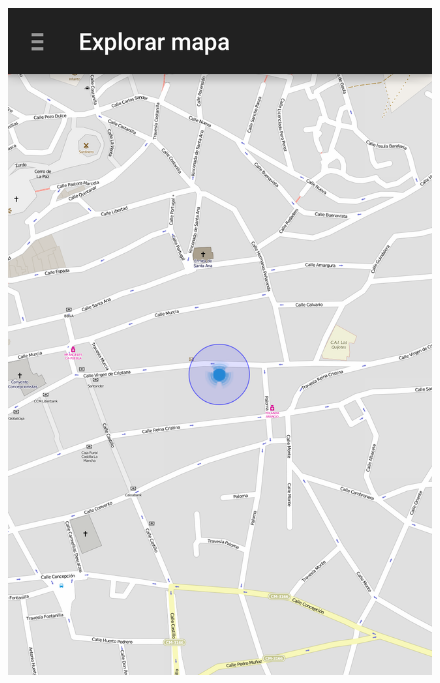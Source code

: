 \begin{slide}
\begin{center}
\begin{figure}[!h]
      \includegraphics[height=0.8\textheight]{img/conprec.png}
    \end{figure}
  \end{center}
\end{slide}


